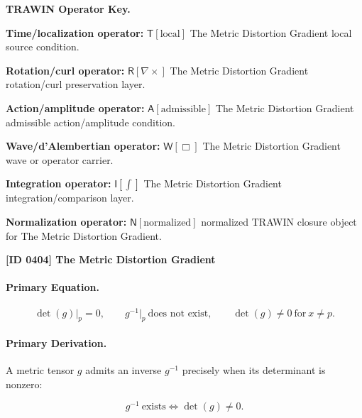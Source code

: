 \par\vspace{0.45\baselineskip}
\noindent\begin{minipage}[t]{\linewidth}
\begingroup
\small
\raggedright
\textbf{TRAWIN Operator Key.}\par
\noindent\textbf{Time/localization operator:} $\mathsf{T}\!\left[\mathrm{local}\right]$ The Metric Distortion Gradient local source condition.\par
\noindent\textbf{Rotation/curl operator:} $\mathsf{R}\!\left[\nabla\times\right]$ The Metric Distortion Gradient rotation/curl preservation layer.\par
\noindent\textbf{Action/amplitude operator:} $\mathsf{A}\!\left[\mathrm{admissible}\right]$ The Metric Distortion Gradient admissible action/amplitude condition.\par
\noindent\textbf{Wave/d'Alembertian operator:} $\mathsf{W}\!\left[\Box\right]$ The Metric Distortion Gradient wave or operator carrier.\par
\noindent\textbf{Integration operator:} $\mathsf{I}\!\left[\int\right]$ The Metric Distortion Gradient integration/comparison layer.\par
\noindent\textbf{Normalization operator:} $\mathsf{N}\!\left[\mathrm{normalized}\right]$ normalized TRAWIN closure object for The Metric Distortion Gradient.\par
\endgroup
\end{minipage}

\clearpage
\noindent\textbf{[ID 0404] The Metric Distortion Gradient}\par
\vspace{0.35em}
\paragraph{Primary Equation.}
\begin{equation}
\det(g)\big|_{p}=0,
\qquad
g^{-1}\big|_{p}\ \text{does not exist},
\qquad
\det(g)\neq 0\ \text{for}\ x\neq p .
\end{equation}

\paragraph{Primary Derivation.}
A metric tensor $g$ admits an inverse $g^{-1}$ precisely when its determinant is nonzero:

\begin{equation}
g^{-1}\ \text{exists}
\iff
\det(g)\neq 0 .
\end{equation}

